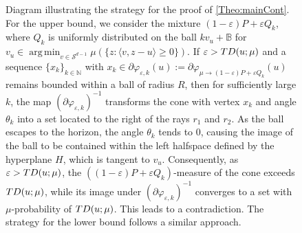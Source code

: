 \documentclass[11pt]{article}
\DeclareMathOperator*{\argmin}{arg\,min}
\newcommand{\eps}{\varepsilon}
\theoremstyle{plain}
\theoremstyle{definition}
\begin{document}
\begin{figure}[ht!]
{}
    \caption{Diagram illustrating the strategy for the proof of \autoref{Theo:mainCont}.
    For the upper bound, we consider the mixture \((1-\eps)P + \eps Q_k\), where \(Q_k\) is uniformly distributed on the ball $k v_u+\mathbb{B}$ for  $v_u\in\argmin_{v\in \mathcal{S}^{d-1}} \mu\left( \{z: \langle v, z - u \rangle \geq 0\} \right) $. If \(\eps > {\rm TD}(u;\mu)\) and a sequence \(\{x_k\}_{k \in \mathbb{N}}\)  {with} $x_k\in \partial \varphi_{\eps,k}(u):=\partial \varphi_{\mu\to ( 1-\eps ) P+\eps Q_{k}}(u)$ remains bounded within a ball of radius \(R\), then for sufficiently large \(k\), the map \((\partial \varphi_{\eps,k})^{-1}\) transforms the cone with vertex \(x_k\) and angle \(\theta_k\) into a set located to the right of the rays \(r_1\) and \(r_2\). As the ball escapes to the horizon, the angle \(\theta_k\) tends to \(0\), causing the image of the ball to be contained within the left halfspace defined by the hyperplane \(H\), which is tangent to $v_u$. Consequently, as \(\eps > {\rm TD}(u;\mu)\), the \(((1-\eps)P+\eps Q_k)\)-measure of the cone exceeds \({\rm TD}(u;\mu)\), while its image under \((\partial \varphi_{\eps,k})^{-1}\) converges to a set with \(\mu\)-probability of \({\rm TD}(u;\mu)\). This leads to a contradiction. 
    The strategy for the lower bound follows a similar approach.}
    \label{fig:strategy}
\end{figure}
\end{document}
